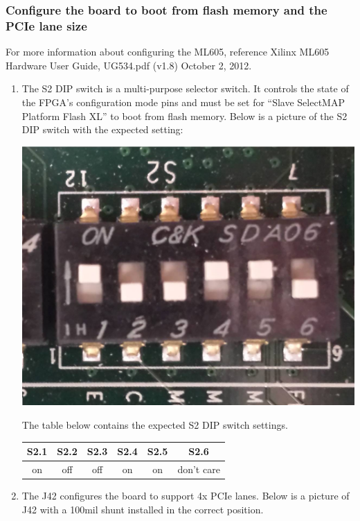 \documentclass{article}
\begin{document}
\subsubsection*{Configure the board to boot from flash memory and the PCIe lane size}
For more information about configuring the ML605, reference Xilinx ML605 Hardware User Guide, UG534.pdf (v1.8) October 2, 2012.
\begin{enumerate}
\item The S2 DIP switch is a multi-purpose selector switch. It controls the state of the FPGA's configuration mode pins and must be set for ``Slave SelectMAP Platform Flash XL'' to boot from flash memory. Below is a picture of the S2 DIP switch with the expected setting:
\\\smallskip
\begin{center}
\includegraphics[scale=0.20]{ML605_S2.jpg}\par\smallskip
 The table below contains the expected S2 DIP switch settings.\par\smallskip
\begin{tabular}{|c|c|c|c|c|c|}
\hline
\rowcolor{blue}
S2.1 & S2.2 & S2.3 & S2.4 & S2.5 & S2.6 \\
\hline
on & off & off & on & on & don't care \\
\hline
\end{tabular}
\end{center}\par\bigskip
\item The J42 configures the board to support 4x PCIe lanes. Below is a picture of J42 with a 100mil shunt installed in the correct position.

\end{enumerate}
\end{document}
